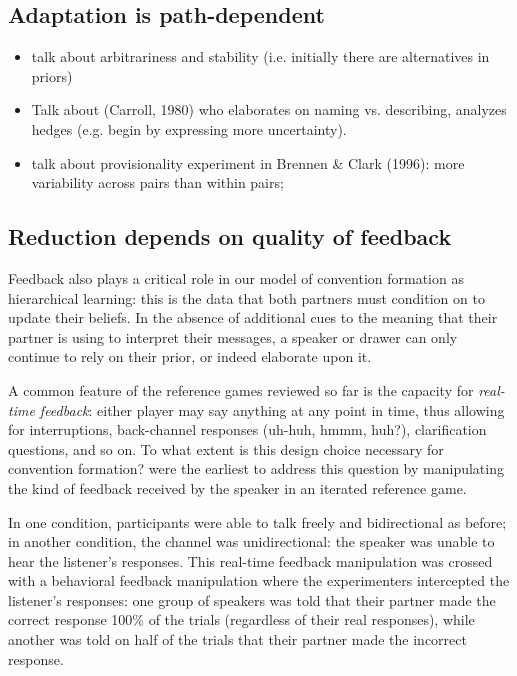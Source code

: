 \documentclass[11pt, floatsintext, jou]{apa6}
\begin{document}
\subsection{Adaptation is path-dependent}

\begin{itemize}

\item talk about arbitrariness and stability (i.e. initially there are alternatives in priors)
\item Talk about (Carroll, 1980) who elaborates on naming vs. describing, analyzes hedges (e.g. begin by expressing more uncertainty).
\item talk about provisionality experiment in Brennen \& Clark (1996): more variability across pairs than within pairs; 
\end{itemize}


\subsection{Reduction depends on quality of feedback}

Feedback also plays a critical role in our model of convention formation as hierarchical learning: this is the data that both partners must condition on to update their beliefs. In the absence of additional cues to the meaning that their partner is using to interpret their messages, a speaker or drawer can only continue to rely on their prior, or indeed elaborate upon it.

A common feature of the reference games reviewed so far is the capacity for \emph{real-time feedback}: either player may say anything at any point in time, thus allowing for interruptions, back-channel responses (uh-huh, hmmm, huh?), clarification questions, and so on. To what extent is this design choice necessary for convention formation?  were the earliest to address this question by manipulating the kind of feedback received by the speaker in an iterated reference game. 

In one condition, participants were able to talk freely and bidirectional as before; in another condition, the channel was unidirectional: the speaker was unable to hear the listener's responses. This real-time feedback manipulation was crossed with a behavioral feedback manipulation where the experimenters intercepted the listener's responses: one group of speakers was told that their partner made the correct response 100\% of the trials (regardless of their real responses), while another was told on half of the trials that their partner made the incorrect response. 
\end{document}
